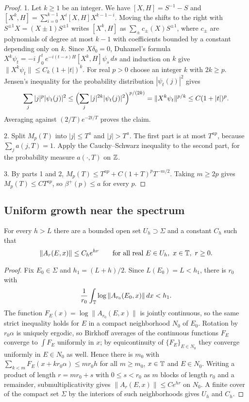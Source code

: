 \begin{proof}
1. Let $k\ge1$ be an integer. We have $[X,H]=S^{-1}-S$ and $[X^k,H]=\sum_{i=0}^{k-1}X^{i}[X,H]X^{k-1-i}$. Moving the shifts to the right with $S^{\pm1}X=(X\pm1)S^{\pm1}$ writes $[X^k,H]$ as $\sum_{\pm}c_\pm(X)S^{\pm1}$, where $c_\pm$ are polynomials of degree at most $k-1$ with coefficients bounded by a constant depending only on $k$. Since $X\delta_0=0$, Duhamel's formula $X^k\psi_t=-i\int_0^te^{-i(t-s)H}[X^k,H]\psi_s\,ds$ and induction on $k$ give $\|X^k\psi_t\|\le C_k(1+|t|)^k$. For real $p>0$ choose an integer $k$ with $2k\ge p$. Jensen's inequality for the probability distribution $|\psi_t(j)|^2$ gives
\[
\sum_j|j|^p|\psi_t(j)|^2\le\Bigl(\sum_j|j|^{2k}|\psi_t(j)|^2\Bigr)^{p/(2k)}=\|X^k\psi_t\|^{p/k}\le C(1+|t|)^p.
\] Averaging against $(2/T)e^{-2t/T}$ proves the claim.

2. Split $M_p(T)$ into $|j|\le T^a$ and $|j|>T^a$. The first part is at most $T^{ap}$, because $\sum_ja(j,T)=1$. Apply the Cauchy--Schwarz inequality to the second part, for the probability measure $a(\cdot,T)$ on $\mathbb Z$.

3. By parts 1 and 2, $M_p(T)\le T^{ap}+C(1+T)^{p}T^{-m/2}$. Taking $m\ge2p$ gives $M_p(T)\le CT^{ap}$, so $\beta^+(p)\le a$ for every $p$.
\end{proof}

\subsection{Uniform growth near the spectrum}

\begin{lemma}\label{lem:growth}
For every $h>L$ there are a bounded open set $U_h\supset\Sigma$ and a constant $C_h$ such that
\[
\|A_r(E,x)\|\le C_he^{hr}\qquad\text{for all real }E\in U_h,\ x\in\T,\ r\ge0.
\]
\end{lemma}

\begin{proof}
Fix $E_0\in\Sigma$ and $h_1=(L+h)/2$. Since $L(E_0)=L<h_1$, there is $r_0$ with
\[
\frac1{r_0}\int_\mathbb T\log\|A_{r_0}(E_0,x)\|\,dx<h_1.
\] The function $F_E(x)=\log\|A_{r_0}(E,x)\|$ is jointly continuous, so the same strict inequality holds for $E$ in a compact neighborhood $N_0$ of $E_0$. Rotation by $r_0\alpha$ is uniquely ergodic, so Birkhoff averages of the continuous functions $F_E$ converge to $\int F_E$ uniformly in $x$; by equicontinuity of $\{F_E\}_{E\in N_0}$ they converge uniformly in $E\in N_0$ as well. Hence there is $m_0$ with $\sum_{k<m}F_E(x+kr_0\alpha)\le mr_0h$ for all $m\ge m_0$, $x\in\mathbb T$ and $E\in N_0$. Writing a product of length $r=mr_0+s$ with $0\le s<r_0$ as $m$ blocks of length $r_0$ and a remainder, submultiplicativity gives $\|A_r(E,x)\|\le C e^{hr}$ on $N_0$. A finite cover of the compact set $\Sigma$ by the interiors of such neighborhoods gives $U_h$ and $C_h$.
\end{proof}


